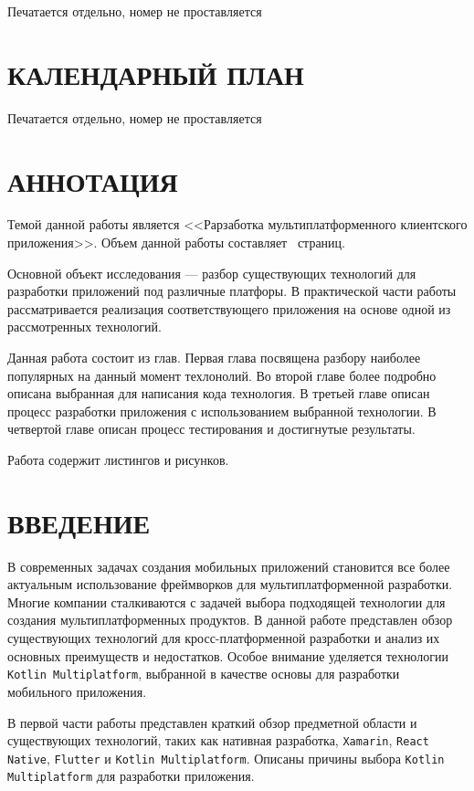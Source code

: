 \documentclass[14pt, russian]{scrartcl}
\newcommand{\anonsection}[1]{\cleardoublepage
\phantomsection
\addcontentsline{toc}{section}{\protect\numberline{}#1}
\section*{#1}\vspace*{2.5ex} %
}
\begin{document}
Печатается отдельно, номер не проставляется

\section*{КАЛЕНДАРНЫЙ ПЛАН}

Печатается отдельно, номер не проставляется

\section*{АННОТАЦИЯ}

Темой данной работы является <<Рарзаботка мультиплатформенного клиентского приложения>>. Объем данной работы составляет~\pageref{TotPages} страниц.

Основной объект исследования --- разбор существующих технологий для разработки приложений под различные платфоры. В практической части работы рассматривается реализация соответствующего приложения на основе одной из рассмотренных технологий.

Данная работа состоит из \totalsections{} глав. Первая глава посвящена разбору наиболее популярных на данный момент техлонолий. Во второй главе более подробно описана выбранная для написания кода технология. В третьей главе описан процесс разработки приложения с использованием выбранной технологии. В четвертой главе описан процесс тестирования и достигнутые результаты.

Работа содержит \totallistings{} листингов и \totalfigures{} рисунков.

\newpage
\renewcommand\contentsname{\hfill{\normalfont{СОДЕРЖАНИЕ}}\hfill}  %
\tableofcontents
\newpage
\anonsection{ВВЕДЕНИЕ}  %

В современных задачах создания мобильных приложений становится все более актуальным использование фреймворков для мультиплатформенной разработки. Многие компании сталкиваются с задачей выбора подходящей технологии для создания мультиплатформенных продуктов. В данной работе представлен обзор существующих технологий для кросс-платформенной разработки и анализ их основных преимуществ и недостатков. Особое внимание уделяется технологии \texttt{Kotlin Multiplatform}, выбранной в качестве основы для разработки мобильного приложения.

В первой части работы представлен краткий обзор предметной области и существующих технологий, таких как нативная разработка, \texttt{Xamarin}, \texttt{React Native}, \texttt{Flutter} и \texttt{Kotlin Multiplatform}. Описаны причины выбора \texttt{Kotlin Multiplatform} для разработки приложения.
\end{document}

